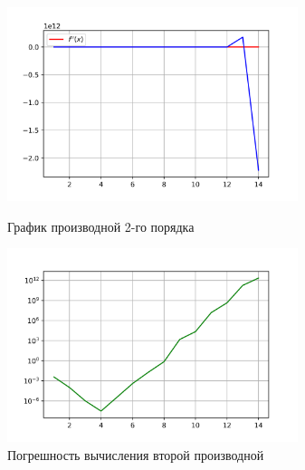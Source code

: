 \begin{figure}[h!]
	\centering                                                                                            
	\begin{minipage}{0.45\textwidth}
	        \centering
	        \includegraphics[width=8.5cm]{images/plot_6.1_2nd_deriv.png} %
	        \caption{График производной 2-го порядка}
	\end{minipage}\hfill
	\begin{minipage}{0.45\textwidth}
		\centering
		\includegraphics[width=8.5cm]{images/plot_6.1_2nd_deriv_err.png} %
		\caption{Погрешность вычисления второй производной}
	\end{minipage}
\end{figure}

